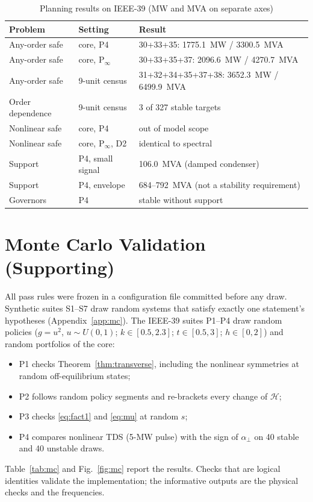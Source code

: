 \documentclass[journal]{IEEEtran}
\theoremstyle{definition}
\theoremstyle{remark}
\newcommand{\Hy}{\mathcal{H}}
\newcommand{\aperp}{\alpha_{\perp}}
\begin{document}
\begin{table}[!t]
\centering
\caption{Planning results on IEEE-39 (MW and MVA on separate axes)}\label{tab:planning}
\setlength{\tabcolsep}{3pt}
\footnotesize
\begin{tabular}{@{}L{0.23\columnwidth}L{0.22\columnwidth}L{0.49\columnwidth}@{}}
\toprule
Problem & Setting & Result \\
\midrule
Any-order safe & core, P4 & 30+33+35: 1775.1~MW / 3300.5~MVA\\
Any-order safe & core, P$_\infty$ & 30+33+35+37: 2096.6~MW / 4270.7~MVA\\
Any-order safe & 9-unit census & 31+32+34+35+37+38: 3652.3~MW / 6499.9~MVA\\
Order dependence & 9-unit census & 3 of 327 stable targets\\
Nonlinear safe & core, P4 & out of model scope\\
Nonlinear safe & core, P$_\infty$, D2 & identical to spectral\\
Support & P4, small signal & 106.0~MVA (damped condenser)\\
Support & P4, envelope & 684--792~MVA (not a stability requirement)\\
Governors & P4 & stable without support\\
\bottomrule
\end{tabular}
\end{table}

\section{Monte Carlo Validation (Supporting)}\label{sec:mc}

All pass rules were frozen in a configuration file committed before any draw.
Synthetic suites S1--S7 draw random systems that satisfy exactly one
statement's hypotheses (Appendix~\ref{app:mc}). The IEEE-39 suites P1--P4 draw
random policies ($g=u^2$, $u\sim U(0,1)$; $k\in[0.5,2.3]$; $t\in[0.5,3]$;
$h\in[0,2]$) and random portfolios of the core:
\begin{itemize}
\item P1 checks Theorem~\ref{thm:transverse}, including the nonlinear
symmetries at random off-equilibrium states;
\item P2 follows random policy segments and re-brackets every change of $\Hy$;
\item P3 checks \eqref{eq:fact1} and \eqref{eq:mu} at random $s$;
\item P4 compares nonlinear TDS (5-MW pulse) with the sign of $\aperp$ on 40
stable and 40 unstable draws.
\end{itemize}
Table~\ref{tab:mc} and Fig.~\ref{fig:mc} report the results. Checks that are
logical identities validate the implementation; the informative outputs are the
physical checks and the frequencies.
\end{document}
